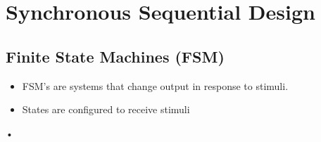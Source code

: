 \documentclass[11pt]{article} %
\theoremstyle{definition}
\begin{document}
	\section{Synchronous Sequential Design}
	\subsection{Finite State Machines (FSM)}
	\begin{itemize}
		\item FSM's are systems that change output in response to stimuli.
		\item States are configured to receive stimuli

\end{itemize}•
\end{document}
